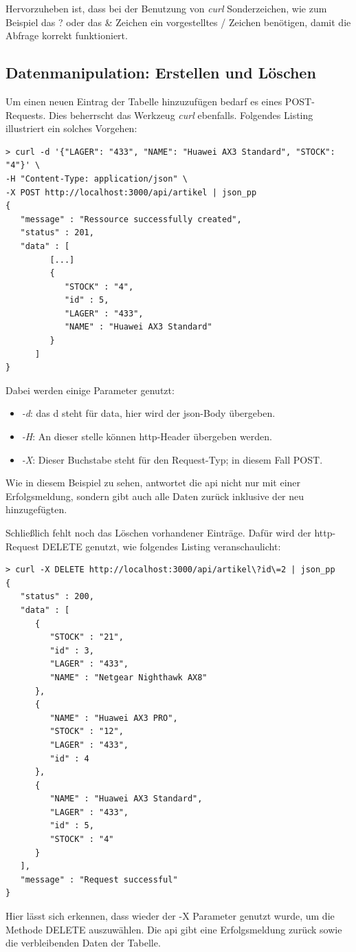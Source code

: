 Hervorzuheben ist, dass bei der Benutzung von \textit{curl} Sonderzeichen, wie zum Beispiel das ? oder das \& Zeichen ein vorgestelltes / Zeichen benötigen, damit die Abfrage korrekt funktioniert. 

\subsection{Datenmanipulation: Erstellen und Löschen}
Um einen neuen Eintrag der Tabelle hinzuzufügen bedarf es eines POST-Requests. Dies beherrscht das Werkzeug \textit{curl} ebenfalls. Folgendes Listing illustriert ein solches Vorgehen:

\begin{verbatim}
> curl -d '{"LAGER": "433", "NAME": "Huawei AX3 Standard", "STOCK": "4"}' \
-H "Content-Type: application/json" \
-X POST http://localhost:3000/api/artikel | json_pp 
{
   "message" : "Ressource successfully created",
   "status" : 201,
   "data" : [
         [...]
         {
            "STOCK" : "4",
            "id" : 5,
            "LAGER" : "433",
            "NAME" : "Huawei AX3 Standard"
         }
      ]
}
\end{verbatim}

Dabei werden einige Parameter genutzt:
\begin{itemize}
    \item \textit{-d}: das d steht für data, hier wird der \gls{json}-Body übergeben. 
    \item \textit{-H}: An dieser stelle können \gls{http}-Header übergeben werden.
    \item \textit{-X}: Dieser Buchstabe steht für den Request-Typ; in diesem Fall POST.
\end{itemize}

Wie in diesem Beispiel zu sehen, antwortet die \gls{api} nicht nur mit einer Erfolgsmeldung, sondern gibt auch alle Daten zurück inklusive der neu hinzugefügten.

Schließlich fehlt noch das Löschen vorhandener Einträge. Dafür wird der \gls{http}-Request DELETE genutzt, wie folgendes Listing veranschaulicht:
\newpage
\begin{verbatim}
> curl -X DELETE http://localhost:3000/api/artikel\?id\=2 | json_pp
{
   "status" : 200,
   "data" : [
      {
         "STOCK" : "21",
         "id" : 3,
         "LAGER" : "433",
         "NAME" : "Netgear Nighthawk AX8"
      },
      {
         "NAME" : "Huawei AX3 PRO",
         "STOCK" : "12",
         "LAGER" : "433",
         "id" : 4
      },
      {
         "NAME" : "Huawei AX3 Standard",
         "LAGER" : "433",
         "id" : 5,
         "STOCK" : "4"
      }
   ],
   "message" : "Request successful"
}
\end{verbatim}

Hier lässt sich erkennen, dass wieder der -X Parameter genutzt wurde, um die Methode DELETE auszuwählen. Die \gls{api} gibt eine Erfolgsmeldung zurück sowie die verbleibenden Daten der Tabelle.